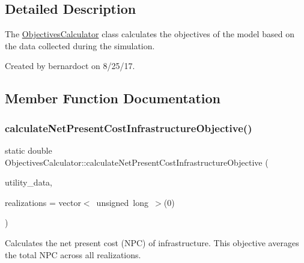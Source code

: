 \subsection{Detailed Description}
The \mbox{\hyperlink{classObjectivesCalculator}{Objectives\+Calculator}} class calculates the objectives of the model based on the data collected during the simulation. 

Created by bernardoct on 8/25/17. 

\subsection{Member Function Documentation}
\mbox{\label{classObjectivesCalculator_ac0860168c763c1957be518ba1a019812}} 
\subsubsection{\texorpdfstring{calculate\+Net\+Present\+Cost\+Infrastructure\+Objective()}{calculateNetPresentCostInfrastructureObjective()}}
{\footnotesize\ttfamily static double Objectives\+Calculator\+::calculate\+Net\+Present\+Cost\+Infrastructure\+Objective (\begin{DoxyParamCaption}\item[{const vector$<$ \mbox{\hyperlink{classUtilitiesDataCollector}{Utilities\+Data\+Collector}} $\ast$$>$ \&}]{utility\+\_\+data,  }\item[{vector$<$ unsigned long $>$}]{realizations = {\ttfamily vector$<$~unsigned~long~$>$(0)} }\end{DoxyParamCaption})\hspace{0.3cm}{\ttfamily [static]}}



Calculates the net present cost (N\+PC) of infrastructure. This objective averages the total N\+PC across all realizations. 



